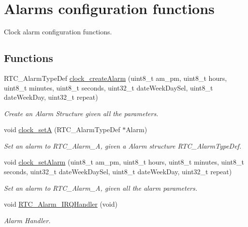 \hypertarget{group___alarms}{}\section{Alarms configuration functions}
\label{group___alarms}


Clock alarm configuration functions.  


\subsection*{Functions}
\begin{DoxyCompactItemize}
\item 
R\+T\+C\+\_\+\+Alarm\+Type\+Def \hyperlink{group___alarms_ga5e1614dbb1a210106dbade3f133db27e}{clock\+\_\+create\+Alarm} (uint8\+\_\+t am\+\_\+pm, uint8\+\_\+t hours, uint8\+\_\+t minutes, uint8\+\_\+t seconds, uint32\+\_\+t date\+Week\+Day\+Sel, uint8\+\_\+t date\+Week\+Day, uint32\+\_\+t repeat)
\begin{DoxyCompactList}\small\item\em Create an Alarm Structure given all the parameters. \end{DoxyCompactList}\item 
void \hyperlink{group___alarms_gab56f512746d4f2638232db28bb7dac2b}{clock\+\_\+setA} (R\+T\+C\+\_\+\+Alarm\+Type\+Def $\ast$Alarm)
\begin{DoxyCompactList}\small\item\em Set an alarm to R\+T\+C\+\_\+\+Alarm\+\_\+A, given a Alarm structure R\+T\+C\+\_\+\+Alarm\+Type\+Def. \end{DoxyCompactList}\item 
void \hyperlink{group___alarms_gaea1a099c4ad6de8b99517ac6453e3569}{clock\+\_\+set\+Alarm} (uint8\+\_\+t am\+\_\+pm, uint8\+\_\+t hours, uint8\+\_\+t minutes, uint8\+\_\+t seconds, uint32\+\_\+t date\+Week\+Day\+Sel, uint8\+\_\+t date\+Week\+Day, uint32\+\_\+t repeat)
\begin{DoxyCompactList}\small\item\em Set an alarm to R\+T\+C\+\_\+\+Alarm\+\_\+A, given all the alarm parameters. \end{DoxyCompactList}\item 
void \hyperlink{group___alarms_ga4da4fb52ec579671d337938e78f9a207}{R\+T\+C\+\_\+\+Alarm\+\_\+\+I\+R\+Q\+Handler} (void)
\begin{DoxyCompactList}\small\item\em Alarm Handler. \end{DoxyCompactList}\end{DoxyCompactItemize}


